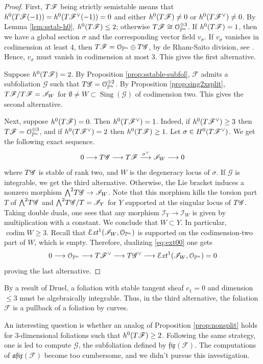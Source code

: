 \documentclass[twoside]{amsart}
\numberwithin{equation}{section}
\newcommand{\opn}{{\mathcal O}_{\mathbb{P}^{n}}}
\newcommand{\sI}{\mathscr{I}}
\DeclareMathOperator{\sing}{Sing}
\DeclareMathOperator{\codim}{codim}
\newcommand{\inext}{{\mathcal E}{\it xt}}
\newcommand{\sF}{\mathscr{F}}
\newcommand{\sG}{\mathscr{G}}
\newcommand{\tF}{{\rm T}\sF}
\newcommand{\tG}{{\rm T}\sG}
\newcommand{\lra}{ \longrightarrow }
\newcommand{\fix}{\mathfrak{fix}}
\newcommand{\afix}{\mathfrak{afix}}
\newcommand{\extp}{{\textstyle \bigwedge}}
\theoremstyle{definition}
\begin{document}
\begin{proof}
First, $\tF$ being strictly semistable means that $h^0(\tF(-1)) = h^0(\tF^\vee(-1)) =0 $ and either $h^0(\tF) \neq 0$ or $h^0(\tF^\vee)\neq 0$.  By Lemma \ref{lem:sstab-h0}, $h^0(\tF) \leq 2$; otherwise $\tF \cong \opn^{\oplus 3}$. If $h^0(\tF) = 1$, then we have a global section $\sigma$ and the corresponding vector field $v_\sigma$. If $v_\sigma$ vanishes in codimension at least $4$, then $\tF = \opn \oplus \tG$, by de Rham-Saito division, see \cite[\S1]{livro-alcides}. Hence, $v_\sigma$ must vanish in codimension at most $3$. This gives the first alternative.

Suppose $h^0(\tF) = 2$. By Proposition \ref{prop:sstable-subfol}, $\sF$ admits a subfoliation $\sG$ such that $\tG = \opn^{\oplus 2}$. By Proposition \ref{prop:sing2xsplit}, $\tF/\tF = \sI_W$ for $\emptyset \neq W \subset \sing(\sG)$ of codimension two. This gives the second alternative.

Next, suppose $h^0(\tF) = 0$. Then $h^0(\tF^\vee)= 1$. Indeed, if $h^0(\tF^\vee) \geq 3$ then $\tF = \opn ^{\oplus 3}$, and if $h^0(\tF^\vee) =2$ then $h^0(\tF) \geq 1$. Let $\sigma \in H^0(\tF^\vee)$. We get the following exact sequence. 
\begin{equation}\label{eq:ext00}
    0 \lra \tG \lra \tF \stackrel{\sigma^\vee}{\lra} \sI_W \lra 0
\end{equation}
where $\tG$ is stable of rank two, and $W$ is the degeneracy locus of $\sigma$. If $\sG$ is integrable, we get the third alternative. Otherwise, the Lie bracket induces a nonzero morphism $\extp^2\tG \to \sI_W$. Note that this morphism kills the torsion part $T$ of $\extp^2\tG$ and $\extp^2\tG/T = \sI_Y$ for $Y$ supported at the singular locus of $\tG$. Taking double duals, one sees that any morphism $\sI_Y \to \sI_W$ is given by multiplication with a constant. We conclude that $W\subset Y$. In particular, $\codim W \geq 3$. Recall that $\inext^1(\sI_W, \opn)$ is supported on the codimension-two part of $W$, which is empty. Therefore, dualizing \eqref{eq:ext00} one gets
\[
0 \lra \opn \lra \tF^\vee \lra \tG^\vee \lra \inext^1(\sI_W, \opn) = 0
\]
proving the last alternative.
\end{proof}

By a result of Druel, a foliation with stable tangent sheaf $c_1=0$ and dimension $\leq 3$ must be algebraically integrable. Thus, in the third alternative, the foliation $\sF$ is a pullback of a foliation by curves. 

An interesting question is whether an analog of Proposition \ref{prop:nonsplit} holds for 3-dimensional foliations such that $h^0(\tF) \geq 2$. Following the same strategy, one is led to compute $\sG$, the subfoliation defined by $\fix(\sF)$. The computations of $\afix(\sF)$ become too cumbersome, and we didn't pursue this investigation.
\end{document}
